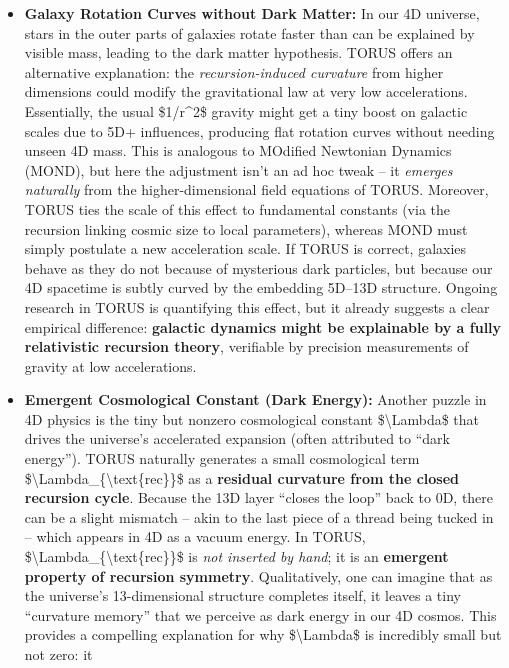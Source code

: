 \documentclass[]{article}
\begin{document}
\begin{itemize}
\item
  \textbf{Galaxy Rotation Curves without Dark Matter:} In our 4D
  universe, stars in the outer parts of galaxies rotate faster than can
  be explained by visible mass, leading to the dark matter hypothesis.
  TORUS offers an alternative explanation: the \emph{recursion-induced
  curvature} from higher dimensions could modify the gravitational law
  at very low accelerations​. Essentially, the usual \$1/r\^{}2\$
  gravity might get a tiny boost on galactic scales due to 5D+
  influences, producing flat rotation curves without needing unseen 4D
  mass. This is analogous to MOdified Newtonian Dynamics (MOND), but
  here the adjustment isn't an ad hoc tweak -- it \emph{emerges
  naturally} from the higher-dimensional field equations of TORUS​.
  Moreover, TORUS ties the scale of this effect to fundamental constants
  (via the recursion linking cosmic size to local parameters), whereas
  MOND must simply postulate a new acceleration scale. If TORUS is
  correct, galaxies behave as they do not because of mysterious dark
  particles, but because our 4D spacetime is subtly curved by the
  embedding 5D--13D structure. Ongoing research in TORUS is quantifying
  this effect, but it already suggests a clear empirical difference:
  \textbf{galactic dynamics might be explainable by a fully relativistic
  recursion theory}, verifiable by precision measurements of gravity at
  low accelerations.
\item
  \textbf{Emergent Cosmological Constant (Dark Energy):} Another puzzle
  in 4D physics is the tiny but nonzero cosmological constant
  \$\textbackslash{}Lambda\$ that drives the universe's accelerated
  expansion (often attributed to ``dark energy''). TORUS naturally
  generates a small cosmological term
  \$\textbackslash{}Lambda\_\{\textbackslash{}text\{rec\}\}\$ as a
  \textbf{residual curvature from the closed recursion cycle}​. Because
  the 13D layer ``closes the loop'' back to 0D, there can be a slight
  mismatch -- akin to the last piece of a thread being tucked in --
  which appears in 4D as a vacuum energy. In TORUS,
  \$\textbackslash{}Lambda\_\{\textbackslash{}text\{rec\}\}\$ is
  \emph{not inserted by hand}; it is an \textbf{emergent property of
  recursion symmetry}​. Qualitatively, one can imagine that as the
  universe's 13-dimensional structure completes itself, it leaves a tiny
  ``curvature memory'' that we perceive as dark energy in our 4D cosmos.
  This provides a compelling explanation for why
  \$\textbackslash{}Lambda\$ is incredibly small but not zero: it

\end{itemize}
\end{document}
